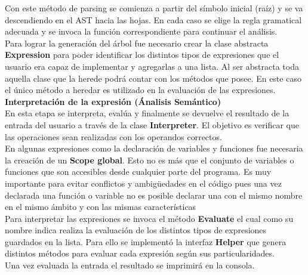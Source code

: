 \documentclass{article}
\begin{document}
\begin{flushleft}
\large {Con este método de parsing se comienza a partir del símbolo inicial (raíz) y se va descendiendo en el AST hacia las hojas. En cada caso se elige la regla gramatical adecuada y se invoca la función correspondiente para continuar el análisis.}\linebreak \\
\large {Para lograr la generación del árbol fue necesario crear la clase abstracta \textbf{Expression} para poder identificar los distintos tipos de expresiones que el usuario era capaz de implementar y agregarlas a una lista. Al ser abstracta toda aquella clase que la herede podrá contar con los métodos que posee. En este caso el único método a heredar es utilizado en la evaluación de las expresiones.}\linebreak \\

\Large {\textbf{Interpretación de la expresión  (Ánalisis Semántico)}}\linebreak \\
\large {En esta etapa se interpreta, evalúa y finalmente se devuelve el resultado de la entrada del usuario a través de la clase \textbf{Interpreter}. El objetivo es verificar que las operaciones sean realizadas con los operandos correctos.}\linebreak \\
\large {En algunas expresiones como la declaración de variables y funciones fue necesaria la creación de un \textbf{Scope global}. Esto no es más que el conjunto de variables o funciones que son accesibles desde cualquier parte del programa. Es muy importante para evitar conflictos y ambigüedades en el código pues una vez declarada una función o variable no es posible declarar una con el mismo nombre en el mismo ámbito y con las mismas características}\linebreak \\
\large {Para interpretar las expresiones se invoca el método \textbf{Evaluate} el cual como su nombre indica realiza la evaluación de los distintos tipos de expresiones guardados en la lista. Para ello se implementó la interfaz \textbf{Helper} que genera distintos métodos para evaluar cada expresión según sus particularidades.}\linebreak \\
\large {Una vez evaluada la entrada el resultado se imprimirá en la consola.}\linebreak \\


\end{flushleft}
\end{document}
